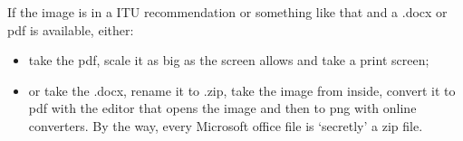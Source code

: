 If the image is in a ITU recommendation or something like that and a .docx or pdf is available, either:
\begin{itemize}
    \item take the pdf, scale it as big as the screen allows and take a print screen;
    \item or take the .docx, rename it to .zip, take the image from inside, convert it to pdf with the editor that opens the image and then to png with online converters. By the way, every Microsoft office file is `secretly' a zip file.
\end{itemize}





